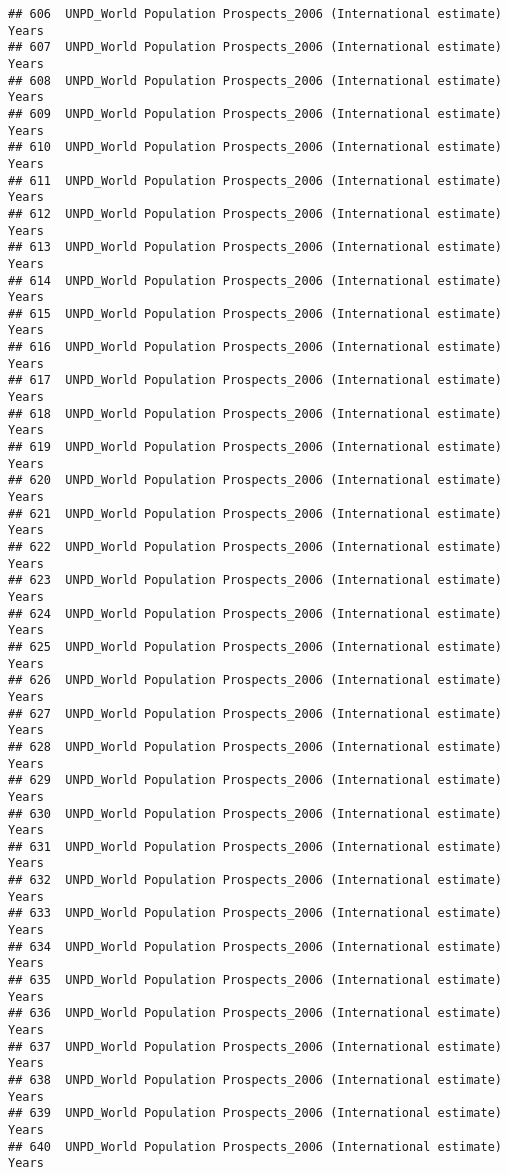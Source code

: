 \documentclass[]{article}
\begin{document}
\begin{verbatim}
## 606  UNPD_World Population Prospects_2006 (International estimate) Years
## 607  UNPD_World Population Prospects_2006 (International estimate) Years
## 608  UNPD_World Population Prospects_2006 (International estimate) Years
## 609  UNPD_World Population Prospects_2006 (International estimate) Years
## 610  UNPD_World Population Prospects_2006 (International estimate) Years
## 611  UNPD_World Population Prospects_2006 (International estimate) Years
## 612  UNPD_World Population Prospects_2006 (International estimate) Years
## 613  UNPD_World Population Prospects_2006 (International estimate) Years
## 614  UNPD_World Population Prospects_2006 (International estimate) Years
## 615  UNPD_World Population Prospects_2006 (International estimate) Years
## 616  UNPD_World Population Prospects_2006 (International estimate) Years
## 617  UNPD_World Population Prospects_2006 (International estimate) Years
## 618  UNPD_World Population Prospects_2006 (International estimate) Years
## 619  UNPD_World Population Prospects_2006 (International estimate) Years
## 620  UNPD_World Population Prospects_2006 (International estimate) Years
## 621  UNPD_World Population Prospects_2006 (International estimate) Years
## 622  UNPD_World Population Prospects_2006 (International estimate) Years
## 623  UNPD_World Population Prospects_2006 (International estimate) Years
## 624  UNPD_World Population Prospects_2006 (International estimate) Years
## 625  UNPD_World Population Prospects_2006 (International estimate) Years
## 626  UNPD_World Population Prospects_2006 (International estimate) Years
## 627  UNPD_World Population Prospects_2006 (International estimate) Years
## 628  UNPD_World Population Prospects_2006 (International estimate) Years
## 629  UNPD_World Population Prospects_2006 (International estimate) Years
## 630  UNPD_World Population Prospects_2006 (International estimate) Years
## 631  UNPD_World Population Prospects_2006 (International estimate) Years
## 632  UNPD_World Population Prospects_2006 (International estimate) Years
## 633  UNPD_World Population Prospects_2006 (International estimate) Years
## 634  UNPD_World Population Prospects_2006 (International estimate) Years
## 635  UNPD_World Population Prospects_2006 (International estimate) Years
## 636  UNPD_World Population Prospects_2006 (International estimate) Years
## 637  UNPD_World Population Prospects_2006 (International estimate) Years
## 638  UNPD_World Population Prospects_2006 (International estimate) Years
## 639  UNPD_World Population Prospects_2006 (International estimate) Years
## 640  UNPD_World Population Prospects_2006 (International estimate) Years

\end{verbatim}
\end{document}
